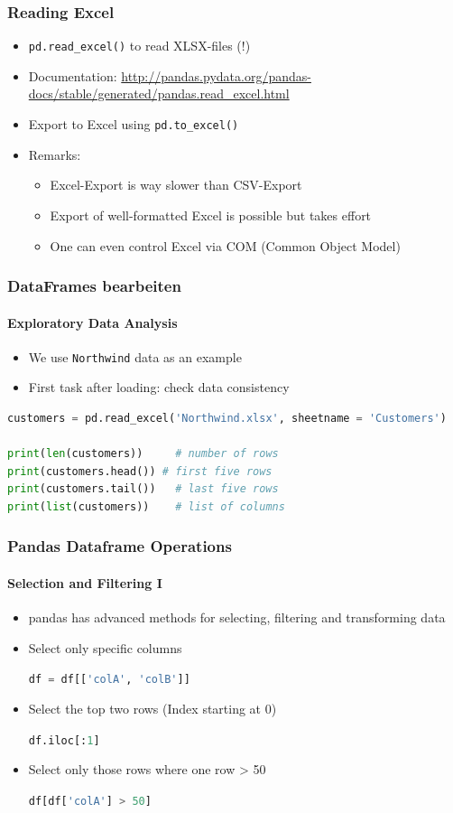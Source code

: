 \documentclass[english]{beamer}
\begin{document}
\begin{frame}
\frametitle{Reading Excel}

\begin{itemize}
\item \lstinline[language={Python}]{pd.read_excel()} to read XLSX-files (!) \item Documentation: \url{http://pandas.pydata.org/pandas-docs/stable/generated/pandas.read_excel.html}
\item Export to Excel using \lstinline[language={Python}]{pd.to_excel()}
\item Remarks:
\begin{itemize}
	\item Excel-Export is way slower than CSV-Export
	\item Export of well-formatted Excel is possible but takes effort
	\item One can even control Excel via COM (Common Object Model)
\end{itemize}
\end{itemize}
\end{frame}

\begin{frame}[fragile]
\frametitle{DataFrames bearbeiten}
\framesubtitle{Exploratory Data Analysis}

\begin{itemize}
	\item We use \texttt{Northwind} data as an example
	\item First task after loading: check data consistency
\end{itemize}

\begin{lstlisting}[language={Python}]
customers = pd.read_excel('Northwind.xlsx', sheetname = 'Customers')

print(len(customers))     # number of rows
print(customers.head()) # first five rows
print(customers.tail())   # last five rows
print(list(customers))    # list of columns
\end{lstlisting}
\end{frame}



\begin{frame}[fragile]
\frametitle{Pandas Dataframe Operations}
\framesubtitle{Selection and Filtering I}

\begin{itemize}
	\item pandas has advanced methods for selecting, filtering and transforming data 
\item Select only specific columns

\lstinline[language={Python}]{df = df[['colA', 'colB']]}

\item Select the top two rows (Index starting at 0)

\lstinline[language={Python}]{df.iloc[:1]}

\item Select only those rows where one row > 50

\lstinline[language={Python}]{df[df['colA'] > 50]}
\end{itemize}
\end{frame}
\end{document}
